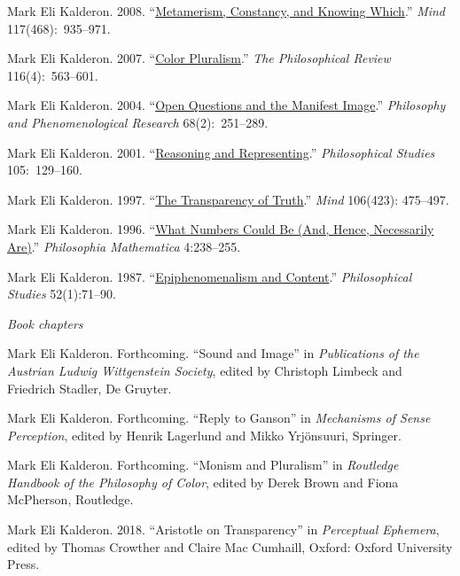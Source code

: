 \documentclass[11pt]{article}
\begin{document}
\ind  Mark Eli Kalderon. 2008.  ``\href{http://mind.oxfordjournals.org/content/117/468/935.full.pdf+html}{Metamerism, Constancy, and Knowing Which}.'' \emph{Mind} 117(468):~935--971. 

\ind  Mark Eli Kalderon. 2007.  ``\href{http://philreview.dukejournals.org/content/116/4/563.full.pdf+html}{Color Pluralism}.'' \emph{The Philosophical Review} 116(4):~563--601.

\ind  Mark Eli Kalderon. 2004.  ``\href{http://onlinelibrary.wiley.com/doi/10.1111/j.1933-1592.2004.tb00341.x/pdf}{Open Questions and the Manifest Image}.'' \emph{Philosophy and Phenomenological Research} 68(2):~251--289.

\ind  Mark Eli Kalderon. 2001.  ``\href{http://www.springerlink.com/content/u5286534982v0317/fulltext.pdf}{Reasoning and Representing}.'' \emph{Philosophical Studies} 105:~129--160.

\ind Mark Eli Kalderon. 1997.
``\href{http://mind.oxfordjournals.org/content/106/423/475.full.pdf}{The Transparency of Truth}.'' \emph{Mind} 106(423): 475--497.

\ind Mark Eli Kalderon. 1996.
``\href{http://philmat.oxfordjournals.org/content/4/3/238.full.pdf}{What Numbers Could Be (And, Hence, Necessarily Are)}.'' \emph{Philosophia Mathematica} 4:238--255.

\ind Mark Eli Kalderon. 1987.
``\href{http://www.jstor.org/stable/4319905}{Epiphenomenalism and Content}.'' \emph{Philosophical Studies} 52(1):71--90.

\bigskip

\noindent\emph{Book chapters \vspace{0.05in}}

\ind Mark Eli Kalderon. Forthcoming. ``Sound and Image'' in \emph{Publications of the Austrian Ludwig Wittgenstein Society}, edited by Christoph Limbeck and Friedrich Stadler, De Gruyter.

\ind Mark Eli Kalderon. Forthcoming. ``Reply to Ganson'' in \emph{Mechanisms of Sense Perception}, edited by Henrik Lagerlund and Mikko Yrjönsuuri, Springer.

\ind Mark Eli Kalderon. Forthcoming. ``Monism and Pluralism'' in \emph{Routledge Handbook of the Philosophy of Color}, edited by Derek Brown and Fiona McPherson, Routledge.

\ind Mark Eli Kalderon. 2018. ``Aristotle on Transparency'' in \emph{Perceptual Ephemera}, edited by Thomas Crowther and Claire Mac Cumhaill, Oxford: Oxford University Press. 
\end{document}
